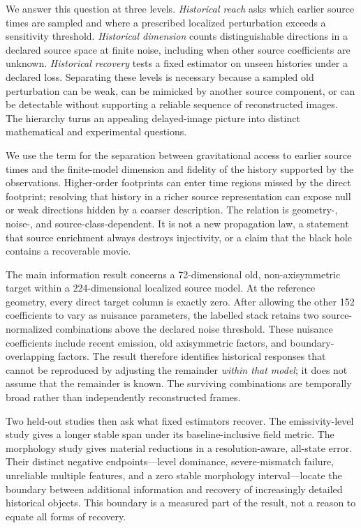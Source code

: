 We answer this question at three levels. \emph{Historical reach} asks which earlier source times are sampled and where a prescribed localized perturbation exceeds a sensitivity threshold. \emph{Historical dimension} counts distinguishable directions in a declared source space at finite noise, including when other source coefficients are unknown. \emph{Historical recovery} tests a fixed estimator on unseen histories under a declared loss. Separating these levels is necessary because a sampled old perturbation can be weak, can be mimicked by another source component, or can be detectable without supporting a reliable sequence of reconstructed images. The hierarchy turns an appealing delayed-image picture into distinct mathematical and experimental questions.

\begin{definition}
We use the term for the separation between gravitational access to earlier source times and the finite-model dimension and fidelity of the history supported by the observations. Higher-order footprints can enter time regions missed by the direct footprint; resolving that history in a richer source representation can expose null or weak directions hidden by a coarser description. The relation is geometry-, noise-, and source-class-dependent. It is not a new propagation law, a statement that source enrichment always destroys injectivity, or a claim that the black hole contains a recoverable movie.
\end{definition}

The main information result concerns a 72-dimensional old, non-axisymmetric target within a 224-dimensional localized source model. At the reference geometry, every direct target column is exactly zero. After allowing the other 152 coefficients to vary as nuisance parameters, the labelled stack retains two source-normalized combinations above the declared noise threshold. These nuisance coefficients include recent emission, old axisymmetric factors, and boundary-overlapping factors. The result therefore identifies historical responses that cannot be reproduced by adjusting the remainder \emph{within that model}; it does not assume that the remainder is known. The surviving combinations are temporally broad rather than independently reconstructed frames.

Two held-out studies then ask what fixed estimators recover. The emissivity-level study gives a longer stable span under its baseline-inclusive field metric. The morphology study gives material reductions in a resolution-aware, all-state error. Their distinct negative endpoints---level dominance, severe-mismatch failure, unreliable multiple features, and a zero stable morphology interval---locate the boundary between additional information and recovery of increasingly detailed historical objects. This boundary is a measured part of the result, not a reason to equate all forms of recovery.

